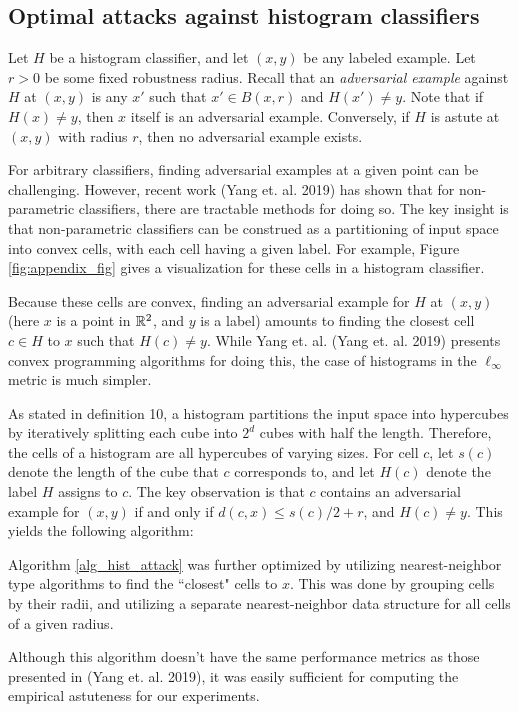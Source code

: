 \subsection{Optimal attacks against histogram classifiers}

Let $H$ be a histogram classifier, and let $(x,y)$ be any labeled example. Let $r > 0$ be some fixed robustness radius. Recall that an \textit{adversarial example} against $H$ at $(x,y)$ is any $x'$ such that $x' \in B(x,r)$ and $H(x') \neq y$. Note that if $H(x) \neq y$, then $x$ itself is an adversarial example. Conversely, if $H$ is astute at $(x,y)$ with radius $r$, then no adversarial example exists.

For arbitrary classifiers, finding adversarial examples at a given point can be challenging. However, recent work (Yang et. al. 2019) has shown that for non-parametric classifiers, there are tractable methods for doing so. The key insight is that non-parametric classifiers can be construed as a partitioning of input space into convex cells, with each cell having a given label. For example, Figure \ref{fig:appendix_fig} gives a visualization for these cells in a histogram classifier. 

Because these cells are convex, finding an adversarial example for $H$ at $(x,y)$ (here $x$ is a point in $\mathbb R^2$, and $y$ is a label) amounts to finding the closest cell $c \in H$ to $x$ such that $H(c) \neq y$. While Yang et. al. (Yang et. al. 2019) presents convex programming algorithms for doing this, the case of histograms in the $\ell_\infty$ metric is much simpler. 

As stated in definition 10, a histogram partitions the input space into hypercubes by iteratively splitting each cube into $2^d$ cubes with half the length. Therefore, the cells of a histogram are all hypercubes of varying sizes. For cell $c$, let $s(c)$ denote the length of the cube that $c$ corresponds to, and let $H(c)$ denote the label $H$ assigns to $c$. The key observation is that $c$ contains an adversarial example for $(x,y)$ if and only if $d(c, x) \leq s(c)/2 + r$, and $H(c) \neq y$. This yields the following algorithm:


Algorithm \ref{alg_hist_attack} was further optimized by utilizing nearest-neighbor type algorithms to find the ``closest" cells to $x$. This was done by grouping cells by their radii, and utilizing a separate nearest-neighbor data structure for all cells of a given radius. 

Although this algorithm doesn't have the same performance metrics as those presented in (Yang et. al. 2019), it was easily sufficient for computing the empirical astuteness for our experiments.

